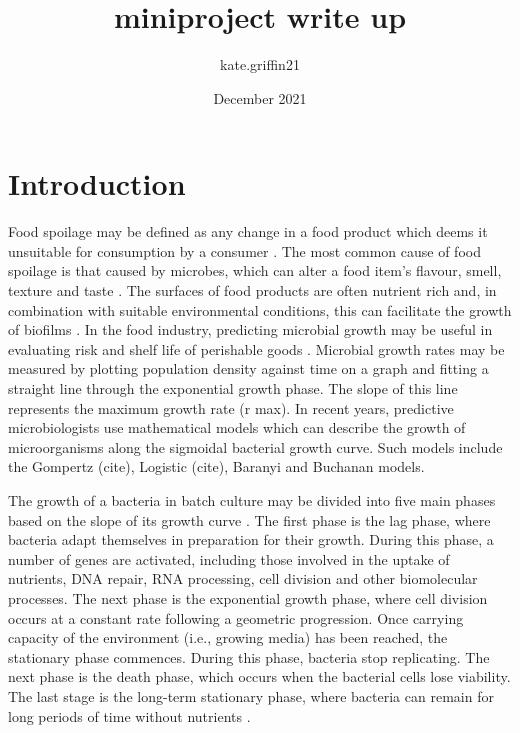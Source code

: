 \documentclass{article}
\title{miniproject write up}
\author{kate.griffin21 }
\date{December 2021}
\begin{document}
\maketitle
\newpage
\tableofcontents
\newpage
\section{Introduction}
\begin{flushleft}

Food spoilage may be defined as any change in a food product which deems it unsuitable for consumption by a consumer \cite{bae2014growth}. The most common cause of food spoilage is that caused by microbes, which can alter a food item’s flavour, smell, texture and taste \cite{bae2014growth}. The surfaces of food products are often nutrient rich and, in combination with suitable environmental conditions, this can facilitate the growth of biofilms \cite{bae2014growth}. In the food industry, predicting microbial growth may be useful in evaluating risk and shelf life of perishable goods \cite{huang2013optimization}\cite{bae2014growth}\cite{zwietering1990modeling}. Microbial growth rates may be measured by plotting population density against time on a graph and fitting a straight line through the exponential growth phase. The slope of this line represents the maximum growth rate (r max). In recent years, predictive microbiologists use mathematical models which can describe the growth of microorganisms along the sigmoidal bacterial growth curve. Such models include the Gompertz (cite), Logistic (cite), Baranyi and Buchanan models\cite{huang2013optimization}.
\linebreak

The growth of a bacteria in batch culture may be divided into five main phases based on the slope of its growth curve \cite{rolfe2012lag}\cite{huang2013optimization}\cite{finkel2006long}\cite{zwietering1990modeling}. The first phase is the lag phase, where bacteria adapt themselves in preparation for their growth. During this phase, a number of genes are activated, including those involved in the uptake of nutrients, DNA repair, RNA processing, cell division and other biomolecular processes. The next phase is the exponential growth phase, where cell division occurs at a constant rate following a geometric progression. Once carrying capacity of the environment (i.e., growing media) has been reached, the stationary phase commences. During this phase, bacteria stop replicating. The next phase is the death phase, which occurs when the bacterial cells lose viability. The last stage is the long-term stationary phase,  where bacteria can remain for long periods of time without nutrients \cite{finkel2006long}.
\linebreak



\end{flushleft}
\end{document}
